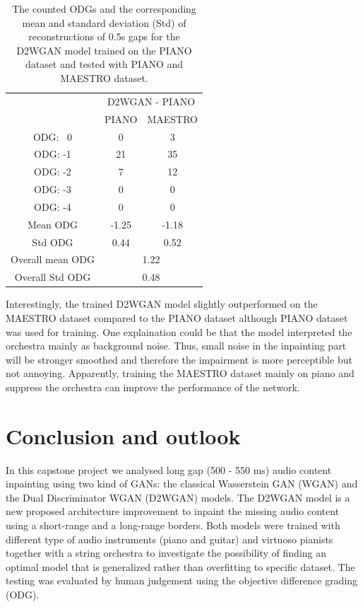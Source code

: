 \documentclass{article} %
\begin{document}
\begin{table}[ht]
    \centering
    \begin{tabular}{c | c c}
         \hline
         & \multicolumn{2}{c}{D2WGAN - PIANO}\\
         & PIANO & MAESTRO \\
        \hline
        ODG: \ 0   & 0 & 3 \\
        ODG: -1    & 21 & 35 \\
        ODG: -2    & 7 & 12 \\
        ODG: -3    & 0 & 0 \\
        ODG: -4    & 0 & 0 \\
        \hline
        Mean ODG    & -1.25 & -1.18 \\
        Std ODG     & 0.44 & 0.52 \\
        \hline
        Overall mean ODG & \multicolumn{2}{c}{1.22} \\
        Overall Std ODG & \multicolumn{2}{c}{0.48}  \\
        \hline
    \end{tabular}
    \caption{The counted ODGs and the corresponding mean and standard deviation (Std) of reconstructions of 0.5s gaps for the D2WGAN model trained on the PIANO dataset and tested with PIANO and MAESTRO dataset.}
    \label{tab:odgs_spec}
\end{table}

Interestingly, the trained D2WGAN model slightly outperformed on the MAESTRO dataset compared to the PIANO dataset although PIANO dataset was used for training. One explaination could be that the model interpreted the orchestra mainly as background noise. Thus, small noise in the inpainting part will be stronger smoothed and therefore the impairment is more perceptible but not annoying. Apparently, training the MAESTRO dataset mainly on piano and suppress the orchestra can improve the performance of the network.


\section{Conclusion and outlook}
In this capstone project we analysed long gap (500 - 550 ms) audio content inpainting using two kind of GANs: the classical Wasserstein GAN (WGAN) and the Dual Discriminator WGAN (D2WGAN) models. The D2WGAN model is a new proposed architecture improvement to inpaint the missing audio content using a short-range and a long-range borders. Both models were trained with different type of audio instruments (piano and guitar) and virtuoso pianists together with a string orchestra to investigate the possibility of finding an optimal model that is generalized rather than overfitting to specific dataset. The testing was evaluated by human judgement using the objective difference grading (ODG).
\end{document}
